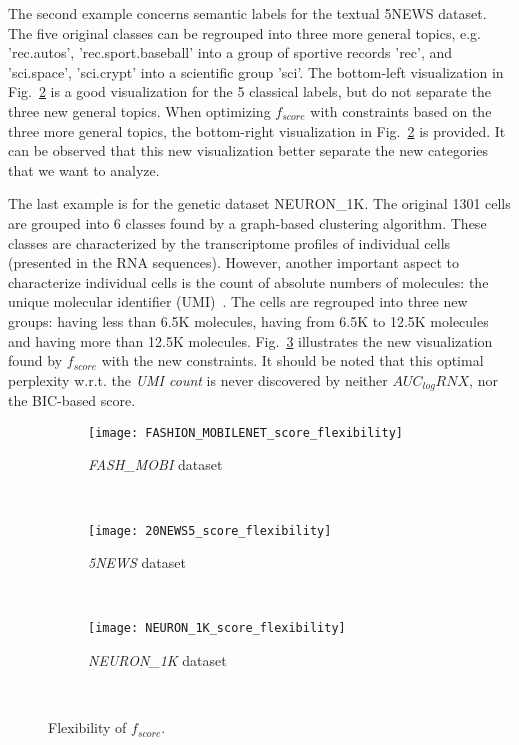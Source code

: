 The second example concerns semantic labels for the textual 5NEWS dataset.
The five original classes can be regrouped into three more general topics, e.g. 'rec.autos', 'rec.sport.baseball' into a group of sportive records 'rec', and 'sci.space', 'sci.crypt' into a scientific group 'sci'. The bottom-left visualization in Fig.~\ref{fig:flexibility:5NEWS} is a good visualization for the 5 classical labels, but do not separate the three new general topics. When optimizing $f_{score}$ with constraints based on the three more general topics, the bottom-right visualization in Fig.~\ref{fig:flexibility:5NEWS} is provided. It can be observed that this new visualization better separate the new categories that we want to analyze.

The last example is for the genetic dataset NEURON\_1K.
The original 1301 cells are grouped into 6 classes found by a graph-based clustering algorithm.
These classes are characterized by the transcriptome profiles of individual cells (presented in the RNA sequences).
However, another important aspect to characterize individual cells is the count of absolute numbers of molecules: the unique molecular identifier (UMI)~\cite{kivioja2011counting}. 
The cells are regrouped into three new groups: having less than 6.5K molecules, having from 6.5K to 12.5K molecules and having more than 12.5K molecules.
Fig.~\ref{fig:flexibility:NEURON1K} illustrates the new visualization found by $f_{score}$ with the new constraints.
It should be noted that this optimal perplexity w.r.t. the \emph{UMI count} is never discovered by neither $AUC_{log}RNX$, nor the BIC-based score.

\begin{figure*}[ht!]
    \centering
    \begin{subfigure}[b]{.32\linewidth}
        \texttt{[image: FASHION\_MOBILENET\_score\_flexibility]}
        \caption{\emph{FASH\_MOBI} dataset}
        \label{fig:flexibility:FASHMOBI}
    \end{subfigure}
    ~
    \begin{subfigure}[b]{.32\linewidth}
        \texttt{[image: 20NEWS5\_score\_flexibility]}
        \caption{\emph{5NEWS} dataset}
        \label{fig:flexibility:5NEWS}
    \end{subfigure}
    ~
    \begin{subfigure}[b]{.32\linewidth}
        \texttt{[image: NEURON\_1K\_score\_flexibility]}
        \caption{\emph{NEURON\_1K} dataset}
        \label{fig:flexibility:NEURON1K}
    \end{subfigure}
    ~
    \caption{Flexibility of $f_{score}$.}
    \label{fig:flexibility}
\end{figure*}


